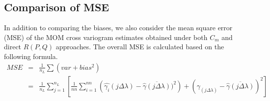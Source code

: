 \subsection{\bf Comparison of MSE}

In addition to comparing the biases, we also consider the mean square error (MSE) of the MOM cross variogram estimates obtained under both $C_m$ and direct $R(P,Q)$ approaches. The overall MSE is calculated based on the following formula.
\begin{eqnarray*}
MSE &=& \frac{1}{n_L} \sum (var + bias^2) \\
    &= & \frac{1}{n_L} \sum_{j=1}^{n_L} \left[ \frac{1}{nn}\sum_{i=1}^{nn}\left(\hat{\gamma_{i}}(j\Delta\lambda)-\overline{\hat{\gamma}(j\Delta\lambda)})^2\right) +  (\gamma_(j\Delta\lambda) - \overline{\hat{\gamma}(j\Delta\lambda)})^2 \right]
\end{eqnarray*}

